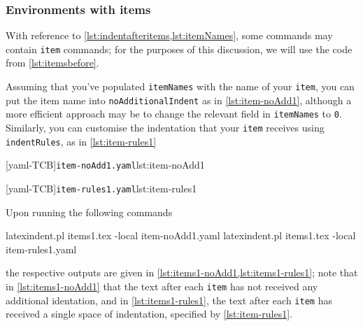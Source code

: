 \subsubsection{Environments with items}
With reference to \vref{lst:indentafteritems,lst:itemNames}, some commands
may contain \texttt{item} commands; for the purposes of this discussion, 
we will use the code from \vref{lst:itemsbefore}.

Assuming that you've populated \texttt{itemNames} with the name of your 
\texttt{item}, you can put the item name into \texttt{noAdditionalIndent}
as in \cref{lst:item-noAdd1}, although a more efficient approach may be 
to change the relevant field in \texttt{itemNames} to \texttt{0}. Similarly, 
you can customise the indentation that your \texttt{item} receives using
\texttt{indentRules}, as in \cref{lst:item-rules1}
 
\begin{minipage}{.45\textwidth}
[yaml-TCB]{\texttt{item-noAdd1.yaml}}{lst:item-noAdd1}
\end{minipage}%
\hfill
\begin{minipage}{.45\textwidth}
[yaml-TCB]{\texttt{item-rules1.yaml}}{lst:item-rules1}
\end{minipage}

Upon running the following commands
\begin{commandshell}
latexindent.pl items1.tex -local item-noAdd1.yaml  
latexindent.pl items1.tex -local item-rules1.yaml  
\end{commandshell}
the respective outputs are given in \cref{lst:items1-noAdd1,lst:items1-rules1}; note that in \cref{lst:items1-noAdd1}
that the text after each \texttt{item} has not received any additional identation, and in \cref{lst:items1-rules1}, 
the text after each \texttt{item} has received a single space of indentation, specified by \cref{lst:item-rules1}.

\begin{minipage}{.45\textwidth}
\end{minipage}
\hfill
\begin{minipage}{.45\textwidth}
\end{minipage}

